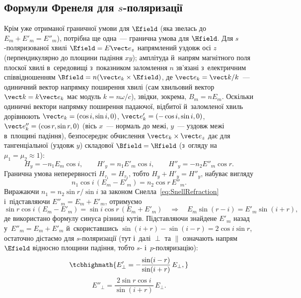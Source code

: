 \subsection*{Формули Френеля для $s$-поляризації}

Крім уже отриманої граничної умови для $\Efield$ (яка звелась до $E_m+E'_m=E''_m$), потрібна ще одна~--- гранична умова для $\Hfield$. Для
$s$-поляризованої хвилі $\Efield=E\vect e_z$ напрямлений уздовж осі $z$ (перпендикулярно до площини падіння $xy$); амплітуда й~напрям
магнітного поля плоскої хвилі в~середовищі з~показником заломлення $n$ зв'язані з~електричним співвідношенням $\Bfield=n(\vect e_k\times\Efield)$, де $\vect e_k=\vect k/k$~--- одиничний вектор напрямку поширення хвилі (сам хвильовий вектор $\vect k=k\vect e_k$ має
модуль $k=n\omega/c$), звідки, зокрема, $B_m=nE_m$. Оскільки одиничні вектори напрямку поширення падаючої, відбитої й~заломленої хвиль дорівнюють $\vect e_k=(\cos i,\sin i,0)$, $\vect e_k'=(-\cos i,\sin i,0)$, $\vect e_k''=(\cos r,\sin r,0)$ (вісь $x$~--- нормаль до межі, $y$~--- уздовж
межі в~площині падіння), безпосереднє обчислення $\vect e_k\times\vect e_z$ дає для тангенціальної (уздовж $y$) складової $\Bfield=\Hfield$
(з~огляду на $\mu_1=\mu_2\approx1$):
\begin{equation*}
	H_y = -n_1E_m\cos i, \qquad H'_y = n_1E'_m\cos i, \qquad H''_y = -n_2E''_m\cos r.
\end{equation*}
Гранична умова неперервності $H_{\tau_1}=H_{\tau_2}$, тобто $H_y+H'_y=H''_y$, набуває вигляду
\begin{equation}\label{eq:FresnelSBoundaryH}
	n_1\cos i\,(E_m-E'_m) = n_2\cos r\,E''_m.
\end{equation}
Виражаючи $n_1=n_2\sin r/\sin i$ за законом Снелла~\eqref{eq:SnellRefraction} і~підставляючи $E''_m=E_m+E'_m$, отримуємо
\begin{equation*}
	\sin r\cos i\,(E_m-E'_m) = \sin i\cos r\,(E_m+E'_m) \quad\Longrightarrow\quad E_m\sin(r-i) = E'_m\sin(i+r),
\end{equation*}
де використано формулу синуса різниці кутів. Підставляючи знайдене $E'_m$ назад у~$E''_m=E_m+E'_m$ й~скориставшись
$\sin(i+r)-\sin(i-r)=2\cos i\sin r$, остаточно дістаємо  для $s$-поляризації (тут і~далі $\perp$ та $\parallel$ означають напрям $\Efield$ відносно площини падіння, тобто $s$- і~$p$-поляризацію):
\begin{equation}\label{eq:FresnelSReflection}
	\tcbhighmath{
		E'_\perp = -\frac{\sin(i-r)}{\sin(i+r)}\, E_\perp,
	}
\end{equation}
\begin{equation}\label{eq:FresnelSTransmission}
	E''_\perp = \frac{2\sin r\cos i}{\sin(i+r)}\, E_\perp.
\end{equation}

